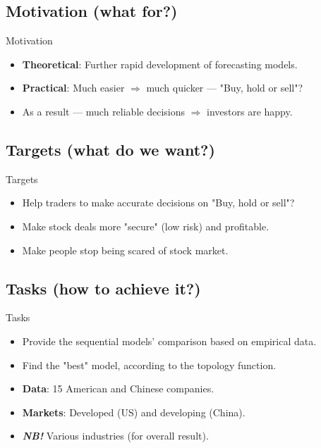\documentclass[11pt, aspectratio= 169]{beamer}
\begin{document}
	\subsection{Motivation (what for?)}
	\begin{frame}{Motivation}
		\Large
		\begin{itemize}
			\item \textbf{Theoretical}: Further rapid development of forecasting models.
			\item \textbf{Practical}: Much easier $\Rightarrow$ much quicker --- "Buy, hold or sell"?
			\item[] As a result --- much reliable decisions $\Rightarrow$ investors are happy.
		\end{itemize}
	\end{frame}
	
	\subsection{Targets (what do we want?)}
	\begin{frame}{Targets}
		\Large
		\begin{itemize}
			\item Help traders to make accurate decisions on "Buy, hold or sell"?
			\item Make stock deals more "secure" (low risk) and profitable.
			\item Make people stop being scared of stock market.
		\end{itemize}
	\end{frame}
	
	\subsection{Tasks (how to achieve it?)}
	\begin{frame}{Tasks}
		\Large
		\begin{itemize}
			\item Provide the sequential models’ comparison based on empirical data.
			\item Find the "best" model, according to the topology function.
			\item \textbf{Data}: 15 American and Chinese companies.
			\item[] \textbf{Markets}: Developed (US) and developing (China).
			\item[] \textbf{\textit{NB!}} Various industries (for overall result). 
		\end{itemize}
	\end{frame}
	
\end{document}
